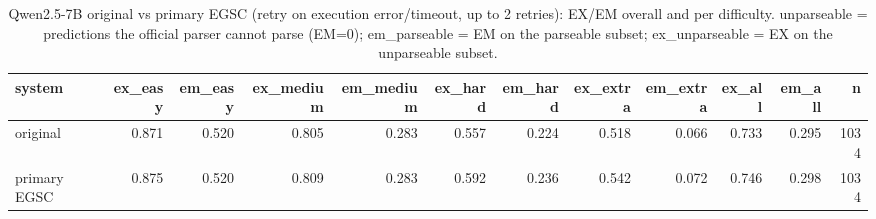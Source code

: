\begin{table}[htbp]
\caption{Qwen2.5-7B original vs primary EGSC (retry on execution error/timeout, up to 2 retries): EX/EM overall and per difficulty. unparseable = predictions the official parser cannot parse (EM=0); em\_parseable = EM on the parseable subset; ex\_unparseable = EX on the unparseable subset.}
\label{tab:task3_egsc_main}
\begin{tabular}{lrrrrrrrrrrr}
\toprule
system & ex\_easy & em\_easy & ex\_medium & em\_medium & ex\_hard & em\_hard & ex\_extra & em\_extra & ex\_all & em\_all & n \\
\midrule
original & 0.871 & 0.520 & 0.805 & 0.283 & 0.557 & 0.224 & 0.518 & 0.066 & 0.733 & 0.295 & 1034 \\
primary EGSC & 0.875 & 0.520 & 0.809 & 0.283 & 0.592 & 0.236 & 0.542 & 0.072 & 0.746 & 0.298 & 1034 \\
\bottomrule
\end{tabular}
\end{table}
